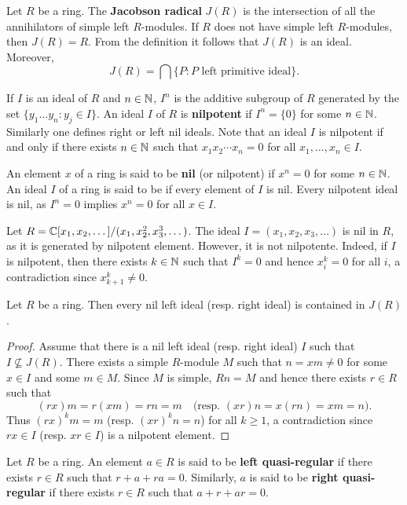 Let $R$ be a ring. The \textbf{Jacobson radical} $J(R)$
is the intersection of all the annihilators of simple left $R$-modules. If $R$ does not
have simple left $R$-modules, then $J(R)=R$. From the definition it follows
that $J(R)$ is an ideal. Moreover, 
	\[
		J(R)=\bigcap\{P:\text{$P$ left primitive ideal}\}.
	\]

If $I$ is an ideal of $R$ and $n\in\mathbb{N}$, $I^n$ is the additive subgroup of $R$ 
generated by the set $\{y_1\dots y_n:y_j\in I\}$. An ideal $I$ of $R$ is \textbf{nilpotent} 
if $I^n=\{0\}$ for some $n\in\mathbb{N}$. Similarly one defines right or left nil ideals. 
Note that an ideal $I$ is nilpotent if and only if there exists $n\in\mathbb{N}$ such that 
$x_1x_2\cdots x_n=0$ for all $x_1,\dots,x_n\in I$.  

An element $x$ of a ring is said to be \textbf{nil} (or nilpotent) if $x^n=0$ for some $n\in\mathbb{N}$. 
An ideal $I$ of a ring is said to be  if every element of $I$ is nil. 
Every nilpotent ideal is nil, as $I^n=0$ implies $x^n=0$ for all 
$x\in I$.

\begin{example}
	Let $R=\mathbb{C}[x_1,x_2,\dots]/(x_1,x_2^2,x_3^3,\dots)$. The ideal 
	$I=(x_1,x_2,x_3,\dots)$ is nil in $R$, as it is generated by nilpotent element. However, it is not nilpotente. Indeed, if $I$ is nilpotent, then there exists $k\in\mathbb{N}$ such that 
	$I^k=0$ and hence $x_i^k=0$ for all $i$, a contradiction since 
	$x_{k+1}^k\ne0$. 	
\end{example}

\begin{proposition}
	\label{pro:nilJ}
	Let $R$ be a ring. Then every nil left ideal (resp. right ideal) is contained in $J(R)$.
\end{proposition}

\begin{proof}
	Assume that there is a nil left ideal (resp. right ideal) $I$ such that 
	$I\not\subseteq J(R)$. There exists a simple $R$-module $M$ such that 
	$n=xm\ne 0$ for some $x\in I$ and some $m\in M$. Since $M$ is simple,
	$Rn=M$ and hence there exists $r\in R$ such that 
	\[
	(rx)m=r(xm)=rn=m\quad\text{(resp.
	$(xr)n=x(rn)=xm=n$).}
	\]
	Thus $(rx)^km=m$ (resp. $(xr)^kn=n$) for all 
	$k\geq1$, a contradiction since $rx\in I$ (resp. $xr\in I$) is a nilpotent element. 
\end{proof}

Let $R$ be a ring. An element $a\in R$ is said to be 
\textbf{left quasi-regular} if there exists $r\in R$ such that $r+a+ra=0$. Similarly, 
$a$ is said to be \textbf{right quasi-regular} if there exists $r\in R$ such that $a+r+ar=0$. 

